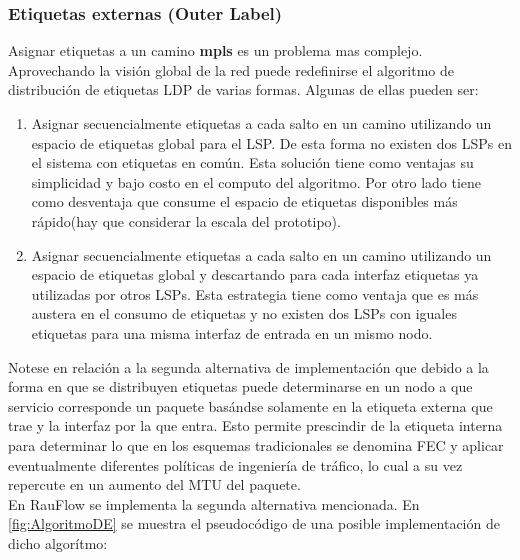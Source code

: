 \subsubsection{Etiquetas externas (Outer Label)}
Asignar etiquetas a un camino \textbf{mpls} es un problema mas complejo. Aprovechando la visión global de la red puede redefinirse el algoritmo de distribución de etiquetas LDP de varias formas. Algunas de ellas pueden ser:

\begin{enumerate}
\item Asignar secuencialmente etiquetas a cada salto en un camino utilizando un espacio de etiquetas global para el LSP. De esta forma no existen dos LSPs en el sistema con etiquetas en com\'un. Esta solución tiene como ventajas su simplicidad y bajo costo en el computo del algoritmo. Por otro lado tiene como desventaja que consume el espacio de etiquetas disponibles m\'as r\'apido(hay que considerar la escala del prototipo).

\item Asignar secuencialmente etiquetas a cada salto en un camino utilizando un espacio de etiquetas global y descartando para cada interfaz etiquetas ya utilizadas por otros LSPs. Esta estrategia tiene como ventaja que es m\'as austera en el consumo de etiquetas y no existen dos LSPs con iguales etiquetas para una misma interfaz de entrada en un mismo nodo.
\end{enumerate}

Notese en relación a la segunda alternativa de implementaci\'on que debido a la forma en que se distribuyen etiquetas puede determinarse en un nodo a que servicio corresponde un paquete bas\'andse solamente en la etiqueta externa que trae y la interfaz por la que entra. Esto permite prescindir de la etiqueta interna para determinar lo que en los esquemas tradicionales se denomina FEC y aplicar eventualmente diferentes pol\'iticas de ingenier\'ia de tr\'afico, lo cual a su vez repercute en un aumento del MTU del paquete.\\ 

En RauFlow se implementa la segunda alternativa mencionada. En \ref{fig:AlgoritmoDE} se muestra el pseudoc\'odigo de una posible implementaci\'on de dicho algor\'itmo:\\

